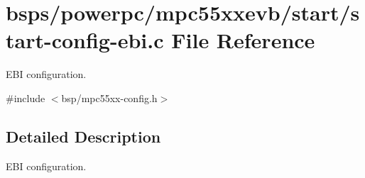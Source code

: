 \hypertarget{start-config-ebi_8c}{}\section{bsps/powerpc/mpc55xxevb/start/start-\/config-\/ebi.c File Reference}
\label{start-config-ebi_8c}


E\+BI configuration.  


{\ttfamily \#include $<$bsp/mpc55xx-\/config.\+h$>$}\newline


\subsection{Detailed Description}
E\+BI configuration. 

